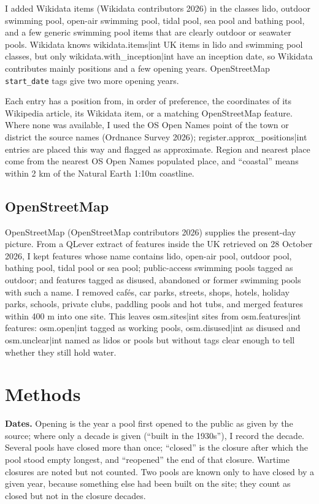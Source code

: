 \documentclass[11pt,a4paper]{article}
\begin{document}
I added Wikidata items (Wikidata contributors 2026) in the classes lido, outdoor swimming pool, open-air swimming pool, tidal pool, sea pool and bathing pool, and a few generic swimming pool items that are clearly outdoor or seawater pools. Wikidata knows {{wikidata.items|int}} UK items in lido and swimming pool classes, but only {{wikidata.with_inception|int}} have an inception date, so Wikidata contributes mainly positions and a few opening years. OpenStreetMap \texttt{start\_date} tags give two more opening years.

Each entry has a position from, in order of preference, the coordinates of its Wikipedia article, its Wikidata item, or a matching OpenStreetMap feature. Where none was available, I used the OS Open Names point of the town or district the source names (Ordnance Survey 2026); {{register.approx_positions|int}} entries are placed this way and flagged as approximate. Region and nearest place come from the nearest OS Open Names populated place, and ``coastal'' means within 2 km of the Natural Earth 1:10m coastline.

\subsection{OpenStreetMap}

OpenStreetMap (OpenStreetMap contributors 2026) supplies the present-day picture. From a QLever extract of features inside the UK retrieved on 28 October 2026, I kept features whose name contains lido, open-air pool, outdoor pool, bathing pool, tidal pool or sea pool; public-access swimming pools tagged as outdoor; and features tagged as disused, abandoned or former swimming pools with such a name. I removed cafés, car parks, streets, shops, hotels, holiday parks, schools, private clubs, paddling pools and hot tubs, and merged features within 400 m into one site. This leaves {{osm.sites|int}} sites from {{osm.features|int}} features: {{osm.open|int}} tagged as working pools, {{osm.disused|int}} as disused and {{osm.unclear|int}} named as lidos or pools but without tags clear enough to tell whether they still hold water.

\section{Methods}

\textbf{Dates.} Opening is the year a pool first opened to the public as given by the source; where only a decade is given (``built in the 1930s''), I record the decade. Several pools have closed more than once; ``closed'' is the closure after which the pool stood empty longest, and ``reopened'' the end of that closure. Wartime closures are noted but not counted. Two pools are known only to have closed by a given year, because something else had been built on the site; they count as closed but not in the closure decades.
\end{document}
